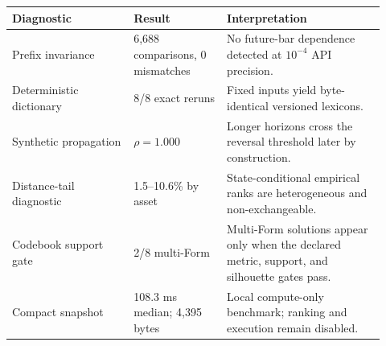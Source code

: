 \begin{tabular}{p{0.30\linewidth}p{0.23\linewidth}p{0.39\linewidth}}
\toprule
Diagnostic & Result & Interpretation \\
\midrule
Prefix invariance & 6,688 comparisons, 0 mismatches & No future-bar dependence detected at $10^{-4}$ API precision. \\
Deterministic dictionary & 8/8 exact reruns & Fixed inputs yield byte-identical versioned lexicons. \\
Synthetic propagation & $\rho=1.000$ & Longer horizons cross the reversal threshold later by construction. \\
Distance-tail diagnostic & 1.5--10.6\% by asset & State-conditional empirical ranks are heterogeneous and non-exchangeable. \\
Codebook support gate & 2/8 multi-Form & Multi-Form solutions appear only when the declared metric, support, and silhouette gates pass. \\
Compact snapshot & 108.3 ms median; 4,395 bytes & Local compute-only benchmark; ranking and execution remain disabled. \\
\bottomrule
\end{tabular}
